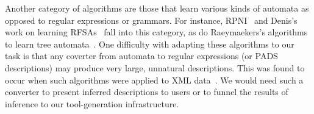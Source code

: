 

Another category of algorithms are those that learn various kinds of
automata as opposed to regular expressions or grammars.  For instance,
RPNI~\cite{rpni} and Denis's work on learning
RFSAs~\cite{denis:learning-regular-languages} fall into this category,
as do Raeymaekers's algorithms to learn tree
automata~\cite{raeymaekers+:wrapper-induction,raeymaekers+:learning-tree-languages}.
One difficulty with adapting these algorithms to our task is that any
coverter from automata to regular expressions (or PADS descriptions)
may produce very large, unnatural descriptions.  This was found to
occur when such algorithms were applied to XML
data~\cite{bex+:dtd-inference}.  We would need such a converter to
present inferred descriptions to users or to funnel the results of
inference to our tool-generation infrastructure.



  

